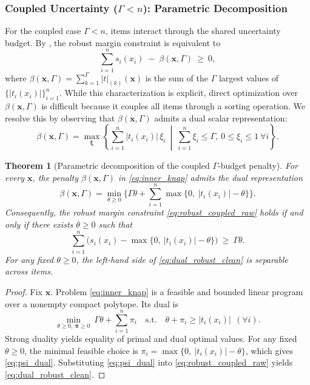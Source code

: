 \documentclass[11pt, a4paper]{article}
\theoremstyle{plain}
\newtheorem{theorem}{Theorem}
\theoremstyle{definition}
\theoremstyle{remark}
\begin{document}
\subsubsection{Coupled Uncertainty (\texorpdfstring{$\Gamma<n$}{Gamma<n}): Parametric Decomposition}
For the coupled case $\Gamma<n$, items interact through the shared uncertainty budget.
By , the robust margin constraint is equivalent to
\begin{equation}\label{eq:robust_coupled_raw}
\sum_{i=1}^n s_i(x_i)\;-\;\beta(\bm{x},\Gamma)\ \ge\ 0,
\end{equation}
where $\beta(\bm{x},\Gamma)=\sum_{k=1}^\Gamma |t|_{(k)}(\bm{x})$ is the sum of the $\Gamma$ largest values of $\{|t_i(x_i)|\}_{i=1}^n$.
While this characterization is explicit, direct optimization over $\beta(\bm{x},\Gamma)$ is difficult because it couples all items
through a sorting operation. We resolve this by observing that $\beta(\bm{x},\Gamma)$ admits a dual scalar representation:
\begin{equation}\label{eq:inner_knap}
\beta(\bm{x},\Gamma)
=\max_{\bm{\xi}}\left\{\sum_{i=1}^n |t_i(x_i)|\,\xi_i \ \middle|\ \sum_{i=1}^n \xi_i\le \Gamma,\ 0\le \xi_i\le 1\ \forall i\right\}.
\end{equation}
\begin{theorem}[Parametric decomposition of the coupled $\Gamma$-budget penalty]\label{thm:parametric}
For every $\bm{x}$, the penalty $\beta(\bm{x},\Gamma)$ in \eqref{eq:inner_knap} admits the dual representation
\begin{equation}\label{eq:psi_dual}
\beta(\bm{x},\Gamma)
=\min_{\theta\ge 0}\Bigg\{\Gamma\theta+\sum_{i=1}^n \max\big\{0,\ |t_i(x_i)|-\theta\big\}\Bigg\}.
\end{equation}
Consequently, the robust margin constraint \eqref{eq:robust_coupled_raw} holds if and only if there exists $\theta\ge 0$ such that
\begin{equation}\label{eq:dual_robust_clean}
\sum_{i=1}^n\Big(s_i(x_i)-\max\big\{0,\ |t_i(x_i)|-\theta\big\}\Big)\ \ge\ \Gamma\theta.
\end{equation}
For any fixed $\theta\ge 0$, the left-hand side of \eqref{eq:dual_robust_clean} is separable across items.
\end{theorem}
\begin{proof}
Fix $\bm{x}$. Problem \eqref{eq:inner_knap} is a feasible and bounded linear program over a nonempty compact polytope.
Its dual is
\[
\min_{\theta\ge 0,\ \bm{\pi}\ge 0}\ \Gamma\theta+\sum_{i=1}^n \pi_i
\quad\text{s.t.}\quad
\theta+\pi_i\ge |t_i(x_i)|\ \ (\forall i).
\]
Strong duality yields equality of primal and dual optimal values. For any fixed $\theta\ge 0$, the minimal feasible choice is
$\pi_i=\max\{0,\ |t_i(x_i)|-\theta\}$, which gives \eqref{eq:psi_dual}. Substituting \eqref{eq:psi_dual} into
\eqref{eq:robust_coupled_raw} yields \eqref{eq:dual_robust_clean}.
\end{proof}
\end{document}
